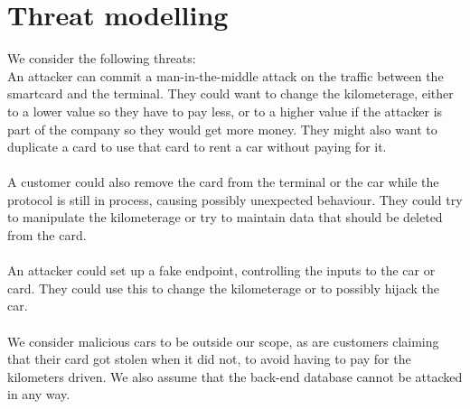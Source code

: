 \documentclass[a4paper]{article}
\begin{document}
\section{Threat modelling}
We consider the following threats:\\
An attacker can commit a man-in-the-middle attack on the traffic between the smartcard and the terminal. They could want to change the kilometerage, either to a lower value so they have to pay less, or to a higher value if the attacker is part of the company so they would get more money. They might also want to duplicate a card to use that card to rent a car without paying for it.\\
\\
A customer could also remove the card from the terminal or the car while the protocol is still in process, causing possibly unexpected behaviour. They could try to manipulate the kilometerage or try to maintain data that should be deleted from the card. \\
\\
An attacker could set up a fake endpoint, controlling the inputs to the car or card. They could use this to change the kilometerage or to possibly hijack the car.\\
\\
We consider malicious cars to be outside our scope, as are customers claiming that their card got stolen when it did not, to avoid having to pay for the kilometers driven. We also assume that the back-end database cannot be attacked in any way. 

\end{document}
